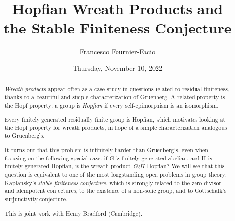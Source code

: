\documentclass{UAmathtalk}
\author{Francesco Fournier-Facio}
\title{Hopfian Wreath Products and\\ the Stable Finiteness Conjecture}
\date{Thursday, November 10, 2022}
\begin{document}
\maketitle

\begin{abstract}
\emph{Wreath products} appear often as a case study in questions related to residual finiteness, thanks to a beautiful and simple characterization of Gruenberg. A related property is the Hopf property: a group is \emph{Hopfian} if every self-epimorphism is an isomorphism.

Every finitely generated residually finite group is Hopfian, which motivates looking at the Hopf property for wreath products, in hope of a simple characterization analogous to Gruenberg's.

It turns out that this problem is infinitely harder than Gruenberg's, even when focusing on the following special case: if G is finitely generated abelian, and H is finitely generated Hopfian, is the wreath product~$G \wr H$ Hopfian? We will see that this question is equivalent to one of the most longstanding open problems in group theory: Kaplansky's \emph{stable finiteness conjecture}, which is strongly related to the zero-divisor and idempotent conjectures, to the existence of a non-sofic group, and to Gottschalk's surjunctivity conjecture.

This is joint work with Henry Bradford (Cambridge).
\end{abstract}
\end{document}
